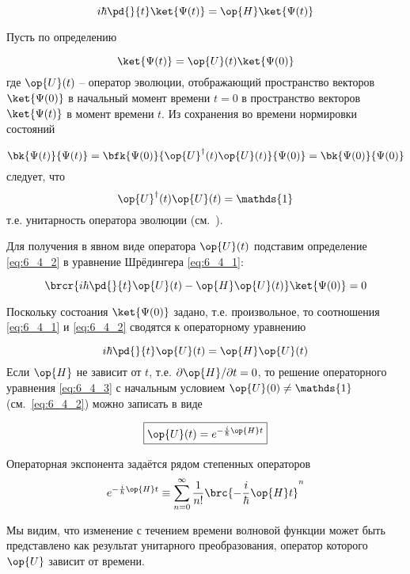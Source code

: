 \begin{equation}
\label{eq:6_4_1}
	i\hbar \pd{}{t} \ket{\Psi(t)} = \op{H}\ket{\Psi(t)}
\end{equation}

Пусть по определению

\begin{equation}
\label{eq:6_4_2}
	\ket{\Psi(t)} = \op{U}(t)\ket{\Psi(0)}
\end{equation}%
%
где $\op{U}(t)$ -- оператор эволюции, отображающий пространство векторов $\ket{\Psi(0)}$ в начальный момент времени $t=0$ в пространство векторов $\ket{\Psi(t)}$ в момент времени $t$. Из сохранения во времени нормировки состояний

$$
\bk{\Psi(t)}{\Psi(t)} = \bfk{\Psi(0)}{\op{U}^\dag(t) \op{U}(t) }{\Psi(0)} = \bk{\Psi(0)}{\Psi(0)}
$$%
%
следует, что
$$\op{U}^\dag(t) \op{U}(t) = \mathds{1}$$
т.е. унитарность оператора эволюции (см.~).

Для получения в явном виде оператора $\op{U}(t)$ подставим определение \eqref{eq:6_4_2} в уравнение Шрёдингера \eqref{eq:6_4_1}:

$$
\brcr{i\hbar \pd{}{t} \op{U}(t) - \op{H}\op{U}(t)} \ket{\Psi(0)} = 0 
$$

Поскольку состоания $\ket{\Psi(0)}$ задано, т.е. произвольное, то соотношения \eqref{eq:6_4_1} и \eqref{eq:6_4_2} сводятся к операторному уравнению

\begin{equation}
\label{eq:6_4_3}
	i\hbar \pd{}{t} \op{U}(t) = \op{H}\op{U}(t)
\end{equation}%
%
Если $\op{H}$ не зависит от $t$, т.е. $\partial \op{H}/\partial t = 0$, то решение операторного уравнения \eqref{eq:6_4_3} с начальным условием $\op{U}(0) \ne \mathds{1}$ (см.~\eqref{eq:6_4_2}) можно записать в виде

\begin{equation}
\label{eq:6_4_4}
	\boxed{\op{U}(t)=e^{-\frac{i}{\hbar} \op{H}t}}
\end{equation}%
%
\begin{defn}
Операторная экспонента задаётся рядом степенных операторов
\begin{equation}
\label{eq:6_4_5}
e^{-\frac{i}{\hbar} \op{H}t} \equiv \sum_{n=0}^{\infty} \frac{1}{n!} \brc{-\frac{i}{\hbar} \op{H}t}^n
\end{equation}
\end{defn}

Мы видим, что изменение с течением времени волновой функции может быть представлено как результат унитарного преобразования, оператор которого $\op{U}$ зависит от времени.


